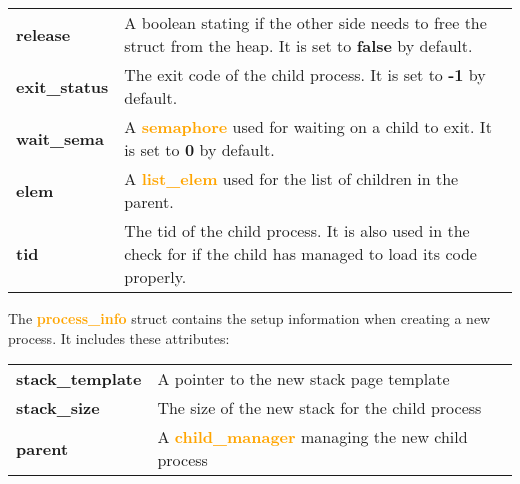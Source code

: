 \documentclass{report}
\newcommand{\file}[1]{\textcolor{YellowGreen}{\textbf{#1}}}
\newcommand{\struct}[1]{\textcolor{orange}{\textbf{#1}}}
\newcommand{\var}[1]{\textcolor{RoyalPurple}{\textbf{#1}}}
\newcommand{\const}[1]{\textcolor{BrickRed}{\textbf{#1}}}
\newcommand{\pintoscode}[4]{}
\newcommand{\pintosfile}[3]{\pintoscode{#1}{#2}{\file{#3}}{#3}}
\begin{document}
								\begin{center}
									\begin{tabular}{l p{10cm}}
											\vspace*{2mm}
											\var{release}         & A boolean stating if the other side needs to free the struct from the heap. It is set to \const{false} by default. \\ \vspace*{2mm}
											\var{exit\_status} 		& The exit code of the child process. It is set to \const{-1} by default. \\ \vspace*{2mm}
											\var{wait\_sema}      & A \struct{semaphore} used for waiting on a child to exit. It is set to \const{0} by default. \\ \vspace*{2mm}
											\var{elem}            & A \struct{list\_elem} used for the list of children in the parent. \\ \vspace*{2mm}
											\var{tid}          		& The tid of the child process. It is also used in the check for if the child has managed to load its code properly. \\
									\end{tabular}
								\end{center}
                
                \pintosfile{30}{35}{process.c}
                The \struct{process\_info} struct contains the setup information when creating a new process. It includes these attributes:
								\begin{center}
									\begin{tabular}{l p{10cm}}
											\vspace*{2mm}
											\var{stack\_template} & A pointer to the new stack page template \\ \vspace*{2mm}
											\var{stack\_size} 		& The size of the new stack for the child process\\ \vspace*{2mm}
											\var{parent}      		& A \struct{child\_manager} managing the new child process \\
									\end{tabular}
								\end{center}

                
\end{document}
